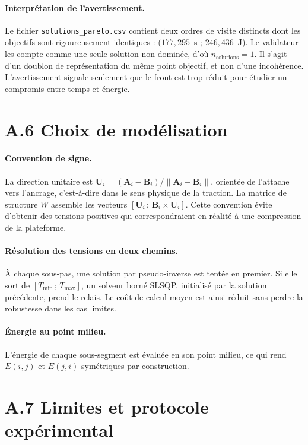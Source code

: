 \paragraph{Interprétation de l'avertissement.}
Le fichier \texttt{solutions\_pareto.csv} contient deux ordres de visite distincts dont les objectifs sont rigoureusement identiques : ($177{,}295$~s ; $246{,}436$~J). Le validateur les compte comme une seule solution non dominée, d'où $n_{\mathrm{solutions}} = 1$. Il s'agit d'un doublon de représentation du même point objectif, et non d'une incohérence. L'avertissement signale seulement que le front est trop réduit pour étudier un compromis entre temps et énergie.

\section*{A.6 Choix de modélisation}

\paragraph{Convention de signe.}
La direction unitaire est $\mathbf{U}_i = (\mathbf{A}_i - \mathbf{B}_i) / \|\mathbf{A}_i - \mathbf{B}_i\|$, orientée de l'attache vers l'ancrage, c'est-à-dire dans le sens physique de la traction. La matrice de structure $W$ assemble les vecteurs $[\mathbf{U}_i\,;\, \mathbf{B}_i \times \mathbf{U}_i]$. Cette convention évite d'obtenir des tensions positives qui correspondraient en réalité à une compression de la plateforme.

\paragraph{Résolution des tensions en deux chemins.}
À chaque sous-pas, une solution par pseudo-inverse est tentée en premier. Si elle sort de $[T_{\min}\,;\, T_{\max}]$, un solveur borné SLSQP, initialisé par la solution précédente, prend le relais. Le coût de calcul moyen est ainsi réduit sans perdre la robustesse dans les cas limites.

\paragraph{Énergie au point milieu.}
L'énergie de chaque sous-segment est évaluée en son point milieu, ce qui rend $E(i,j)$ et $E(j,i)$ symétriques par construction.

\section*{A.7 Limites et protocole expérimental}

